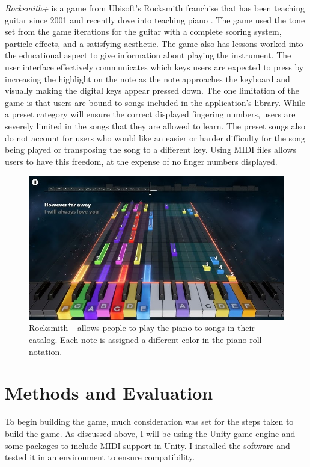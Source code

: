 \documentclass[10pt,twocolumn]{article}
\begin{document}
\textit{Rocksmith+} is a game from Ubisoft's Rocksmith franchise that has been teaching guitar since 2001 and recently dove into teaching piano \cite{RocksmithUbisoft}. The game used the tone set from the game iterations for the guitar with a complete scoring system, particle effects, and a satisfying aesthetic. The game also has lessons worked into the educational aspect to give information about playing the instrument. The user interface effectively communicates which keys users are expected to press by increasing the highlight on the note as the note approaches the keyboard and visually making the digital keys appear pressed down. The one limitation of the game is that users are bound to songs included in the application's library. While a preset category will ensure the correct displayed fingering numbers, users are severely limited in the songs that they are allowed to learn. The preset songs also do not account for users who would like an easier or harder difficulty for the song being played or transposing the song to a different key. Using MIDI files allows users to have this freedom, at the expense of no finger numbers displayed. 


\begin{figure}
    \centering
    \includegraphics[width=.95\linewidth]{rocksmithpiano.png}
    \caption{
       Rocksmith+ allows people to play the piano to songs in their catalog. Each note is assigned a different color in the piano roll notation.
    }
    \label{fig:first-page}
\end{figure}


\section{Methods and Evaluation}

To begin building the game, much consideration was set for the steps taken to build the game. As discussed above, I will be using the Unity game engine and some packages to include MIDI support in Unity. I installed the software and tested it in an environment to ensure compatibility. 
\end{document}

